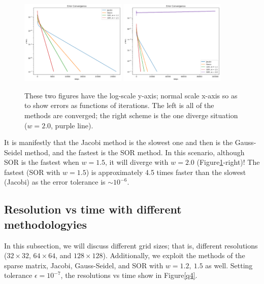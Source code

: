 \documentclass[12pt]{article}
\begin{document}
    \begin{figure}[H]
        \centering
        \includegraphics[width = 0.45\textwidth]{./fig/3.1.png}
        \includegraphics[width = 0.45\textwidth]{./fig/3.2.png}
        \caption{These two figures have the log-scale y-axis; normal scale x-axis so as to show errors as functions of iterations. The left is all of the methods are converged; the right scheme is the one diverge situation ($w = 2.0$, purple line).}\label{q3}
    \end{figure}

    It is manifestly that the Jacobi method is the slowest one and then is the Gauss-Seidel method, and the fastest is the SOR method. In this scenario, although SOR is the fastest when $w = 1.5$, it will diverge with $w = 2.0$ (Figure\ref{q3}-right)! The fastest (SOR with $w = 1.5$) is approximately 4.5 times faster than the slowest (Jacobi) as the error tolerance is $\sim 10^{-6}$.

    \subsection{Resolution vs time with different methodologyies}
    In this subsection, we will discuss different grid sizes; that is, different resolutions ($32 \times 32$, $64 \times 64$, and $128 \times 128$). Additionally, we exploit the methods of the sparse matrix, Jacobi, Gauss-Seidel, and SOR with $w = 1.2,\ 1.5$ as well. Setting tolerance $\epsilon = 10^{-7}$, the resolutions vs time show in Figure\ref{q4}.
\end{document}
